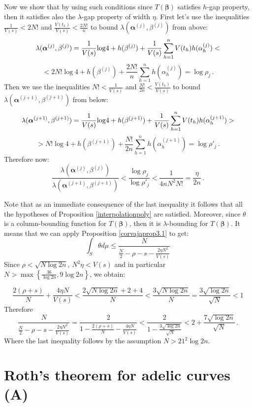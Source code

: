 \documentclass[10 pt,a4paper]{article}
\theoremstyle{plain}
\theoremstyle{definition}
\theoremstyle{named}
\begin{document}
Now we show that by using such conditions since $T(\bm{\beta})$ satisfies $h$-gap property, then it satisfies also the $\lambda$-gap property of width $\eta$. First let's use the inequalities $\frac{1}{V(s)}<2N!$  and $\frac{V(t_h)}{V(s)}<\frac{2N!}{n}$ to bound $\lambda(\bm{\alpha}^{(j)},\beta^{(j)})$ from above:
\[
\lambda(\bm{\alpha}^{(j)},\beta^{(j)})=\frac{1}{V(s)}{\rm{log}}4+h(\beta^{(j)})+\frac{1}{V(s)}\sum_{h=1}^{n}V(t_h)h(\alpha_{h}^{(j)})<
\]
\[
< 2N!\log4+h(\beta^{(j)})+\frac{2N!}{n}\sum_{h=1}^{n}h(\alpha_{h}^{(j)})=\log \rho_j\,.
\]
Then we use the inequalities $N!<\frac{1}{V(s)}$ and $\frac{N!}{2n}<\frac{V(t_h)}{V(s)}$ to bound $\lambda(\bm{\alpha}^{(j+1)},\beta^{(j+1)})$ from below:
\[
\lambda(\bm{\alpha}^{(j+1)},\beta^{(j+1)})=\frac{1}{V(s)}{\rm{log}}4+h(\beta^{(j+1)})+\frac{1}{V(s)}\sum_{h=1}^{n}V(t_h)h(\alpha_{h}^{(j+1)})>
\]
\[
> N!\log4+h(\beta^{(j+1)})+\frac{N!}{2n}\sum_{h=1}^{n}h(\alpha_{h}^{(j+1)})=\log \rho'_j\,.
\]
Therefore now:
\[
\frac{\lambda(\bm{\alpha}^{(j)},\beta^{(j)})}{\lambda(\bm{\alpha}^{(j+1)},\beta^{(j+1)})}<\frac{\log \rho_j}{\log \rho'_j}<\frac{1}{4nN^2N!}=\frac{\eta}{2n}\,.
\]

Note that as an immediate consequence of the last inequality  it follows that all the hypotheses of Proposition \ref{interpolationpoly} are satisfied.  Moreover, since $\theta$ is a column-bounding function for $T(\bm{\beta})$, then it is $\lambda$-bounding for $T(\bm{\beta})$. It means that we can apply Proposition \ref{corvajaprop3.1} to get:
\begin{equation}\label{lastupb}
\int_{ S}\theta d \mu\le \frac{N}{\frac{N}{2}-\rho-s-\frac{2\eta N^2}{V(s)} }
\end{equation} 
Since  $\rho< \sqrt{N\log 2n}$,  $N^2\eta<V(s)$ and in particular  $N>\max\left\{\frac{36}{\log 2n}, 9\log 2n\right\}$, we obtain:

\[
\frac{2(\rho+s)}{N}+\frac{4\eta N}{V(s)}<\frac{2\sqrt{N\log2n}+2+4}{N}<\frac{3\sqrt{N\log 2n}}{N}=\frac{3\sqrt{\log 2n}}{\sqrt N}<1
\]
Therefore
\[
\frac{N}{\frac{N}{2}-\rho-s-\frac{2\eta N^2}{V(s)}}=\frac{2}{1-\frac{2(\rho+s)}{N}-  \frac{4\eta N}{V(s)}}<\frac{2}{1-\frac{3\sqrt{\log 2n}}{\sqrt N}}<2+\frac{7\sqrt{\log 2n}}{\sqrt{N}}\,.
\]
Where the last inequality follows by the assumption $N>21^2\log 2n$.
\endproof



\section{Roth's theorem for adelic curves (A)}\label{mainsect}
\end{document}
